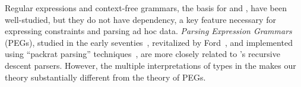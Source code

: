 Regular expressions and context-free grammars, the basis for \lex{} and
\yacc{}, have been well-studied, but they do not have dependency, a key
feature necessary for expressing constraints and parsing ad hoc
data.  {\em Parsing Expression Grammars} (PEGs), studied in
the early seventies~\cite{birman+:parsing}, revitalized 
by Ford~\cite{ford:pegs}, and implemented using ``packrat parsing''
techniques~\cite{ford:packrat,grimm:packrat}, are more closely
related to \padsml{}'s recursive descent parsers. However, the
multiple interpretations of types in the \ddc{} makes our theory
substantially different from the theory of PEGs.






